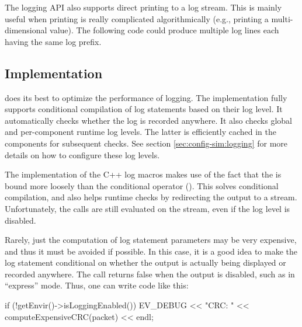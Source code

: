 The {\opp} logging API also supports direct printing to a log stream. This is
mainly useful when printing is really complicated algorithmically (e.g., printing
a multi-dimensional value). The following code could produce multiple log lines
each having the same log prefix.

\begin{cpp}
void Matrix::print(std::stream &output) { ... }
void Matrix::someFunction()
{
   print(EV_INFO);
\end{cpp}

\subsection{Implementation}
\label{sec:sim-lib:logging-implementation}

{\opp} does its best to optimize the performance of logging. The implementation
fully supports conditional compilation of log statements based on their log
level. It automatically checks whether the log is recorded anywhere. It also
checks global and per-component runtime log levels. The latter is efficiently
cached in the components for subsequent checks. See section
\ref{sec:config-sim:logging} for more details on how to configure these log
levels.

The implementation of the C++ log macros makes use of the fact that the
 is bound more loosely than the conditional operator
(). This solves conditional compilation, and also helps runtime
checks by redirecting the output to a  stream. Unfortunately, the
 calls are still evaluated on the  stream, even if
the log level is disabled.

Rarely, just the computation of log statement parameters may be very expensive,
and thus it must be avoided if possible. In this case, it is a good idea to
make the log statement conditional on whether the output is actually being
displayed or recorded anywhere. The  call
returns false when the output is disabled, such as in ``express'' mode. Thus,
one can write code like this:


\begin{cpp}
if (!getEnvir()->isLoggingEnabled())
    EV_DEBUG << "CRC: " << computeExpensiveCRC(packet) << endl;
\end{cpp}




